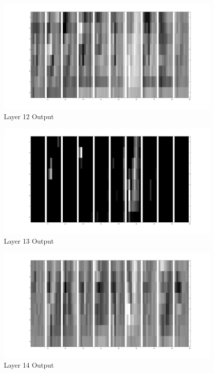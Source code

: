 \documentclass[11pt,english]{article}
\begin{document}
\begin{appendices}
\begin{figure}[h!]
  \caption{Layer 12 Output}
  \centering
    \includegraphics[width=\textwidth]{layer/12}
\end{figure}

\begin{figure}[h!]
  \caption{Layer 13 Output}
  \centering
    \includegraphics[width=\textwidth]{layer/13}
\end{figure}

\begin{figure}[h!]
  \caption{Layer 14 Output}
  \centering
    \includegraphics[width=\textwidth]{layer/14}
\end{figure}


\end{appendices}
\end{document}
